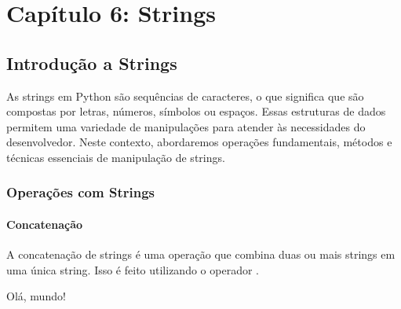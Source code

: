 \documentclass[letterpaper,10pt,english]{jupyterBook}
\begin{document}
\sphinxstepscope


\chapter{Capítulo 6: Strings}
\label{\detokenize{chapters/ch6/ch6:capitulo-6-strings}}\label{\detokenize{chapters/ch6/ch6::doc}}

\section{Introdução a Strings}
\label{\detokenize{chapters/ch6/ch6:introducao-a-strings}}
\sphinxAtStartPar
As strings em Python são sequências de caracteres, o que significa que são compostas por letras, números, símbolos ou espaços. Essas estruturas de dados permitem uma variedade de manipulações para atender às necessidades do desenvolvedor. Neste contexto, abordaremos operações fundamentais, métodos e técnicas essenciais de manipulação de strings.


\subsection{Operações com Strings}
\label{\detokenize{chapters/ch6/ch6:operacoes-com-strings}}

\subsubsection{Concatenação}
\label{\detokenize{chapters/ch6/ch6:concatenacao}}
\sphinxAtStartPar
A concatenação de strings é uma operação que combina duas ou mais strings em uma única string. Isso é feito utilizando o operador \sphinxcode{\sphinxupquote{+}}.

\sphinxAtStartPar
{}

\begin{sphinxVerbatim}[commandchars=\\\{\}]
  
  
    
\end{sphinxVerbatim}

\begin{sphinxVerbatim}[commandchars=\\\{\}]
Olá, mundo!
\end{sphinxVerbatim}
\end{document}
